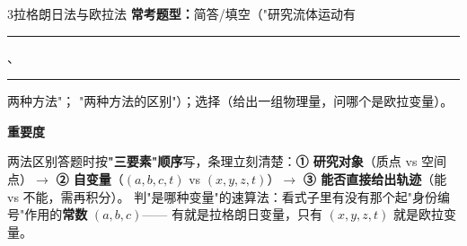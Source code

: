 \begin{kaodian}{3}{拉格朗日法与欧拉法}
\textbf{常考题型：}简答/填空（"研究流体运动有\rule{2cm}{0.4pt}、\rule{2cm}{0.4pt}两种方法"；
"两种方法的区别"）；选择（给出一组物理量，问哪个是欧拉变量）。

\textbf{重要度 }\quad{}\quad{}

\begin{banfa}
两法区别答题时按\textbf{"三要素"顺序}写，条理立刻清楚：\textbf{① 研究对象}（质点 vs 空间点）$\rightarrow$
\textbf{② 自变量}（$(a,b,c,t)$ vs $(x,y,z,t)$）$\rightarrow$ \textbf{③ 能否直接给出轨迹}（能 vs 不能，需再积分）。
判"是哪种变量"的速算法：看式子里有没有那个起"身份编号"作用的\textbf{常数} $(a,b,c)$——
有就是拉格朗日变量，只有 $(x,y,z,t)$ 就是欧拉变量。
\end{banfa}
\end{kaodian}


